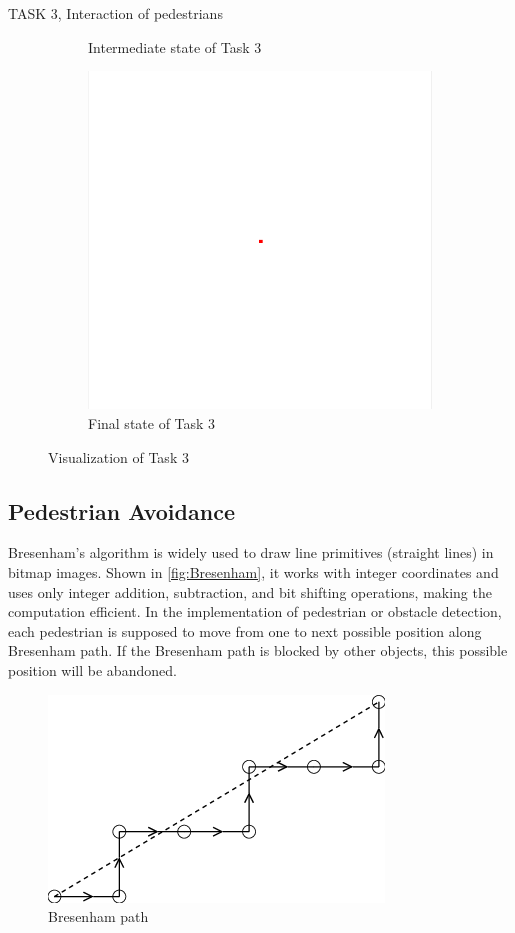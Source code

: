 \documentclass[10pt,a4paper]{article}
\begin{document}
\begin{task}{TASK 3, Interaction of pedestrians}
\begin{figure}[htbp]
\begin{subfigure}[b]{0.31\textwidth}
    \caption{Intermediate state of Task 3}
    \label{fig:Task3_intermediate}
  \end{subfigure}
  \begin{subfigure}[b]{0.31\textwidth}
    \includegraphics[width=\textwidth]{pictures/Task3_end.png}
    \caption{Final state of Task 3}
    \label{fig:Task3_end}
  \end{subfigure}
  \caption{Visualization of Task 3}
  \label{fig:task3}
\end{figure}


\subsection{Pedestrian Avoidance}

Bresenham’s algorithm is widely used to draw line primitives (straight lines) in bitmap images. Shown in \autoref{fig:Bresenham}, it works with integer coordinates and uses only integer addition, subtraction, and bit shifting operations, making the computation efficient\cite{bolder2001high}. In the implementation of pedestrian or obstacle detection, each pedestrian is supposed to move from one to next possible position along Bresenham path. If the Bresenham path is blocked by other objects, this possible position will be abandoned.

\begin{figure}
    \centering
    \includegraphics[width=0.5\linewidth]{pictures/Bresenham.png}
    \caption{Bresenham path}
    \label{fig:Bresenham}
\end{figure}


\end{task}
\end{document}
